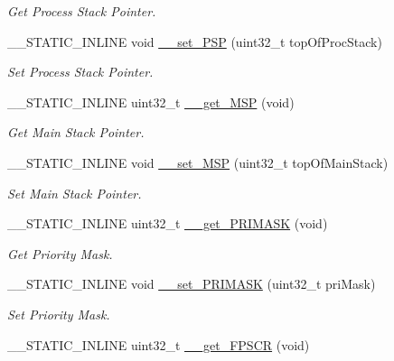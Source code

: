 \begin{DoxyCompactItemize}
\begin{DoxyCompactList}\small\item\em Get Process Stack Pointer. \end{DoxyCompactList}\item 
\+\_\+\+\_\+\+S\+T\+A\+T\+I\+C\+\_\+\+I\+N\+L\+I\+NE void \mbox{\hyperlink{group___c_m_s_i_s___core___reg_acc_functions_ga21f50fc02c3927a8ebf0bc3678c06862}{\+\_\+\+\_\+set\+\_\+\+P\+SP}} (uint32\+\_\+t top\+Of\+Proc\+Stack)
\begin{DoxyCompactList}\small\item\em Set Process Stack Pointer. \end{DoxyCompactList}\item 
\+\_\+\+\_\+\+S\+T\+A\+T\+I\+C\+\_\+\+I\+N\+L\+I\+NE uint32\+\_\+t \mbox{\hyperlink{group___c_m_s_i_s___core___reg_acc_functions_ga667e7b8b97b4a30f445ae45d37588e45}{\+\_\+\+\_\+get\+\_\+\+M\+SP}} (void)
\begin{DoxyCompactList}\small\item\em Get Main Stack Pointer. \end{DoxyCompactList}\item 
\+\_\+\+\_\+\+S\+T\+A\+T\+I\+C\+\_\+\+I\+N\+L\+I\+NE void \mbox{\hyperlink{group___c_m_s_i_s___core___reg_acc_functions_ga08b66e2b60a46fada36d90d2bc1e7c9b}{\+\_\+\+\_\+set\+\_\+\+M\+SP}} (uint32\+\_\+t top\+Of\+Main\+Stack)
\begin{DoxyCompactList}\small\item\em Set Main Stack Pointer. \end{DoxyCompactList}\item 
\+\_\+\+\_\+\+S\+T\+A\+T\+I\+C\+\_\+\+I\+N\+L\+I\+NE uint32\+\_\+t \mbox{\hyperlink{group___c_m_s_i_s___core___reg_acc_functions_ga4ff59fb9e280d19e79e6875863a65f0a}{\+\_\+\+\_\+get\+\_\+\+P\+R\+I\+M\+A\+SK}} (void)
\begin{DoxyCompactList}\small\item\em Get Priority Mask. \end{DoxyCompactList}\item 
\+\_\+\+\_\+\+S\+T\+A\+T\+I\+C\+\_\+\+I\+N\+L\+I\+NE void \mbox{\hyperlink{group___c_m_s_i_s___core___reg_acc_functions_gaf4a17d3be7dbb066489836d849930d92}{\+\_\+\+\_\+set\+\_\+\+P\+R\+I\+M\+A\+SK}} (uint32\+\_\+t pri\+Mask)
\begin{DoxyCompactList}\small\item\em Set Priority Mask. \end{DoxyCompactList}\item 
\+\_\+\+\_\+\+S\+T\+A\+T\+I\+C\+\_\+\+I\+N\+L\+I\+NE uint32\+\_\+t \mbox{\hyperlink{group___c_m_s_i_s___core___reg_acc_functions_ga6a275172e274ea7ce6c22030d07c6c64}{\+\_\+\+\_\+get\+\_\+\+F\+P\+S\+CR}} (void)

\end{DoxyCompactItemize}
